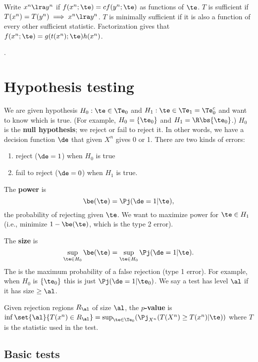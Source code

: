 Write $x^n\lra y^n$ if $f(x^n;\te)=cf(y^n;\te)$ as functions of $\te$. $T$ is sufficient if $T(x^n)=T(y^n)\implies x^n\lra y^n$.
$T$ is minimally sufficient if it is also a function of every other sufficient statistic. Factorization gives that $f(x^n;\te)=g(t(x^n);\te)h(x^n)$.

.
\section{Hypothesis testing}


We are given hypothesis $H_0:\te\in \Te_0$ and $H_1:\te\in \Te_1=\Te_0^c$ and want to know which is true. (For example, $H_0=\{\te_0\}$ and $H_1=\R\bs \{\te_0\}$.) $H_0$ is the \textbf{null hypothesis}; we reject or fail to reject it. In other words, we have a decision function $\de$ that given $X^n$ gives 0 or 1.
There are two kinds of errors:
\begin{enumerate}
\item reject ($\de=1$) when $H_0$ is true
\item fail to reject ($\de = 0$) when $H_1$ is true.
\end{enumerate}

\begin{df}
The \textbf{power} is 
\[
\be(\te) = \Pj(\de=1|\te),
\]
the probability of rejecting given $\te$. We want to maximize power for $\te\in H_1$ (i.e., minimize $1-\be(\te)$, which is the type 2 error).

The \textbf{size} is
\[
\sup_{\te\in H_0}\be(\te) = \sup_{\te\in H_0}\Pj(\de=1|\te).
\]
The is the maximum probability of a false rejection (type 1 error). For example, when $H_0$ is $\{\te_0\}$ this is just $\Pj(\de=1|\te_0)$.
We say a test has level $\al$ if it has size $\ge \al$.

Given rejection regions $R_\al$ of size $\al$, the \textbf{$p$-value} is $\inf\set{\al}{T(x^n)\in R_{\al}}=\sup_{\te\in \Te_0}(\Pj_{X^n}(T(X^n)\ge T(x^n)|\te))$ where $T$ is the statistic used in the test. 
\end{df}

\subsection{Basic tests}

